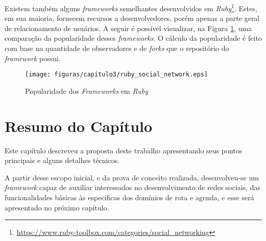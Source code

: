 Existem também alguns \textit{frameworks} semelhantes desenvolvidos em \textit{Ruby}\footnote{\url{https://www.ruby-toolbox.com/categories/social_networking}}. Estes, em sua maioria, fornecem recursos a desenvolvedores, porém apenas a parte geral de relacionamento de usuários. A seguir é possível visualizar, na Figura \ref{ruby_social_network}, uma comparação da popularidade desses \textit{frameworks}. O cálculo da popularidade é feito com base na quantidade de observadores e de \textit{forks} que o repositório do \textit{framework} possui.

\begin{figure}[!h]
	\centering
	\texttt{[image: figuras/capitulo3/ruby\_social\_network.eps]}
	\caption{Popularidade dos \textit{Frameworks} em \textit{Ruby}}
	\label{ruby_social_network}
\end{figure}

\section{Resumo do Capítulo}

Este capítulo descreveu a proposta deste trabalho apresentando seus pontos principais e alguns detalhes técnicos.

A partir desse escopo inicial, e da prova de conceito realizada, desenvolveu-se um \textit{framework}  capaz de auxiliar interessados no desenvolvimento de redes sociais, das funcionalidades básicas às específicas dos domínios de rota e agenda, e esse será apresentado no próximo capítulo.
